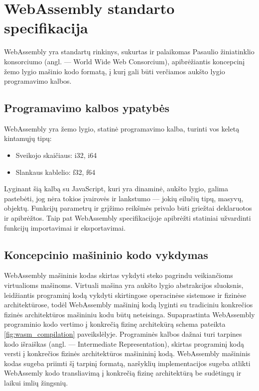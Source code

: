 \documentclass{VUMIFPSkursinis}
\begin{document}
\section{WebAssembly standarto specifikacija}

WebAssembly yra standartų rinkinys, sukurtas ir palaikomas Pasaulio žiniatinklio konsorciumo (angl. — World Wide Web Consorcium), apibrėžiantis koncepcinį žemo lygio mašinio kodo formatą, į kurį gali būti verčiamos aukšto lygio programavimo kalbos. \cite{WAS17}

\subsection{Programavimo kalbos ypatybės}
WebAssembly yra žemo lygio, statinė programavimo kalba, turinti vos keletą kintamųjų tipų:

\begin{itemize}
    \item Sveikojo skaičiaus: i32, i64
    \item Slankaus kablelio: f32, f64
\end{itemize}
Lyginant šią kalbą su JavaScript, kuri yra dinaminė, aukšto lygio, galima pastebėti, jog nėra tokios įvairovės ir lankstumo — jokių eilučių tipų, masyvų, objektų. Funkcijų parametrų ir grįžimo reikšmės privalo būti griežtai deklaruotos ir apibrėžtos. Taip pat WebAssembly specifikacijoje apibrėžti statiniai užvardinti funkcijų importavimai ir eksportavimai.


\subsection{Koncepcinio mašininio kodo vykdymas}
WebAssembly mašininis kodas skirtas vykdyti steko pagrindu veikiančioms virtualioms mašinoms. Virtuali mašina yra aukšto lygio abstrakcijos sluoksnis, leidžiantis programinį kodą vykdyti skirtingose operacinėse sistemose ir fizinėse architektūrose, todėl WebAssembly mašininį kodą lyginti su tradiciniu konkrečios fizinės architektūros mašininiu kodu būtų neteisinga. \cite{Cal17} Supaprastinta WebAssembly programinio kodo vertimo į konkrečią fizinę architekūrą schema pateikta \ref{fig:wasm_compilation} paveikslėlyje. Programinės kalbos dažnai turi tarpines kodo išraiškas (angl. — Intermediate Representation), skirtas programinį kodą versti į konkrečios fizinės architektūros mašinininį kodą. WebAssembly mašininis kodas sugeba priimti šį tarpinį formatą, naršyklių implementacijos sugeba atlikti WebAssemly kodo transliavimą į konkrečią fizinę architektūrą be sudėtingų ir laikui imlių žingsnių. 
\end{document}

